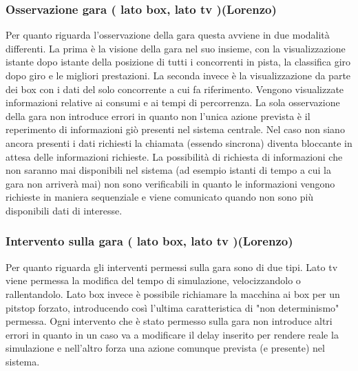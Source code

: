 \subsubsection{Osservazione gara ( lato box, lato tv )(Lorenzo)}
Per quanto riguarda l'osservazione della gara questa avviene in due modalità differenti. La prima è la visione della gara nel suo insieme, con la visualizzazione istante dopo istante della posizione di tutti i concorrenti in pista, la classifica giro dopo giro e le migliori prestazioni. La seconda invece è la visualizzazione da parte dei box con i dati del solo concorrente a cui fa riferimento. Vengono visualizzate informazioni relative ai consumi e ai tempi di percorrenza. La sola osservazione della gara non introduce errori in quanto non l'unica azione prevista è il reperimento di informazioni giò presenti nel sistema centrale. Nel caso non siano ancora presenti i dati richiesti la chiamata (essendo sincrona) diventa bloccante in attesa delle informazioni richieste. La possibilità di richiesta di informazioni che non saranno mai disponibili nel sistema (ad esempio istanti di tempo a cui la gara non arriverà mai) non sono verificabili in quanto le informazioni vengono richieste in maniera sequenziale e viene comunicato quando non sono più disponibili dati di interesse.
\subsubsection{Intervento sulla gara ( lato box, lato tv )(Lorenzo)}
Per quanto riguarda gli interventi permessi sulla gara sono di due tipi. Lato tv viene permessa la modifica del tempo di simulazione, velocizzandolo o rallentandolo. Lato box invece è possibile richiamare la macchina ai box per un pitstop forzato, introducendo così l'ultima caratteristica di "non determinismo" permessa.
Ogni intervento che è stato permesso sulla gara non introduce altri errori in quanto in un caso va a modificare il delay inserito per rendere reale la simulazione e nell'altro forza una azione comunque prevista (e presente) nel sistema. 